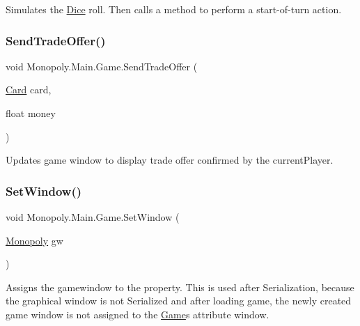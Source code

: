 Simulates the \mbox{\hyperlink{class_monopoly_1_1_main_1_1_dice}{Dice}} roll. Then calls a method to perform a start-\/of-\/turn action. \mbox{\label{class_monopoly_1_1_main_1_1_game_ae62facb9164f78451e20826727cbc50f}} 
\subsubsection{\texorpdfstring{Send\+Trade\+Offer()}{SendTradeOffer()}}
{\footnotesize\ttfamily void Monopoly.\+Main.\+Game.\+Send\+Trade\+Offer (\begin{DoxyParamCaption}\item[{\mbox{\hyperlink{class_monopoly_1_1_cards_1_1_card}{Card}}}]{card,  }\item[{float}]{money }\end{DoxyParamCaption})\hspace{0.3cm}{\ttfamily [inline]}}

Updates game window to display trade offer confirmed by the current\+Player. \mbox{\label{class_monopoly_1_1_main_1_1_game_a22b8fa77077e7bd5530e1e4e0d05a4ff}} 
\subsubsection{\texorpdfstring{Set\+Window()}{SetWindow()}}
{\footnotesize\ttfamily void Monopoly.\+Main.\+Game.\+Set\+Window (\begin{DoxyParamCaption}\item[{\mbox{\hyperlink{class_monopoly_1_1_main_1_1_monopoly}{Monopoly}}}]{gw }\end{DoxyParamCaption})\hspace{0.3cm}{\ttfamily [inline]}}

Assigns the gamewindow to the property. This is used after Serialization, because the graphical window is not Serialized and after loading game, the newly created game window is not assigned to the \mbox{\hyperlink{class_monopoly_1_1_main_1_1_game}{Game}}\textquotesingle{}s attribute window. \mbox{\label{class_monopoly_1_1_main_1_1_game_a8b3ae822f53278aadf9358a4b770b0fa}} 

